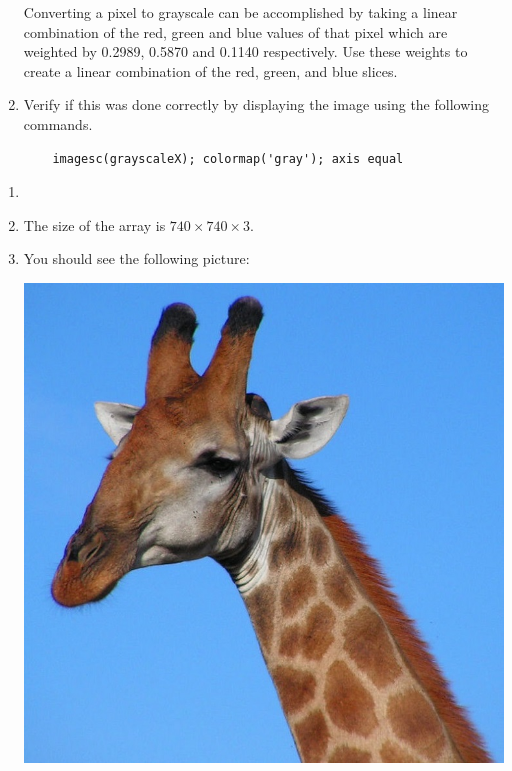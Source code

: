 \begin{prob}
\begin{enumerate}
    Converting a pixel to grayscale can be accomplished by taking a linear combination of the red, green and blue values of that pixel which are weighted by 0.2989, 0.5870 and 0.1140 respectively. Use these weights to create a linear combination of the red, green, and blue slices.


    \item  Verify if this was done correctly by displaying the image using the following commands.
    \begin{verbatim}
    imagesc(grayscaleX); colormap('gray'); axis equal
    \end{verbatim}

    \end{enumerate}
    \end{prob}
    
    \begin{sol}
    \begin{enumerate}
    \item 
        \item The size of the array is $740\times740\times3$.
        \item You should see the following picture:
            \begin{center}
            \includegraphics[scale=.4]{FacesNight1/figs/giraffe.jpg}
            \label{fig:giraffe}

\end{center}
\end{enumerate}
\end{sol}
